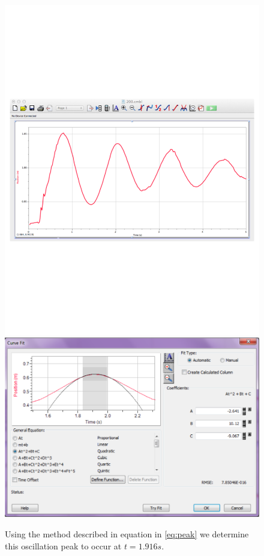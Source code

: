 \documentclass[12pt]{iopart}
\begin{document}
\begin{figure}
\includegraphics[width=\columnwidth]{loggerpro_osc_screen.pdf}  
\includegraphics[width=\columnwidth]{Sample_Data_Fit.pdf}
\caption{Using the method described in equation  in \ref{eq:peak} we determine this oscillation peak to occur at $t=1.916s$. 
}
\label{fig:loggerpro_fit}
\end{figure}
\end{document}
